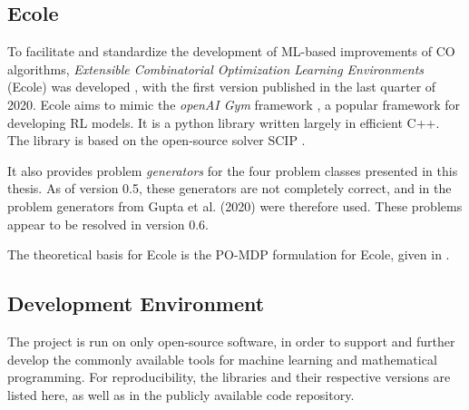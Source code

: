 \subsection{Ecole}\label{ssec:ecole}

To facilitate and standardize the development of \gls{ML}-based improvements of \gls{CO} algorithms, \textit{Extensible Combinatorial Optimization Learning Environments} (\gls{Ecole}) was developed \cite{prouvost2020ecole}, with the first version published in the last quarter of 2020. \gls{Ecole} aims to mimic the \textit{openAI Gym} framework \cite{brockman2016openai}, a popular framework for developing \gls{RL} models. It is a python library written largely in efficient C++. 
The library is based on the open-source solver \gls{SCIP} \cite{achterberg2009scip}.


It also provides problem \textit{generators} for the four problem classes presented in this thesis. As of version 0.5, these generators are not completely correct, and in the problem generators from Gupta et al. (2020) \cite{gupta2020hybrid} were therefore used. These problems appear to be resolved in version 0.6.  


The theoretical basis for \gls{Ecole} is the \gls{PO-MDP} formulation for \gls{Ecole}, given in .





\subsection{Development Environment}

The project is run on only open-source software, in order to support and further develop the commonly available tools for machine learning and mathematical programming. For reproducibility, the libraries and their respective versions are listed here, as well as in the publicly available code repository. 

